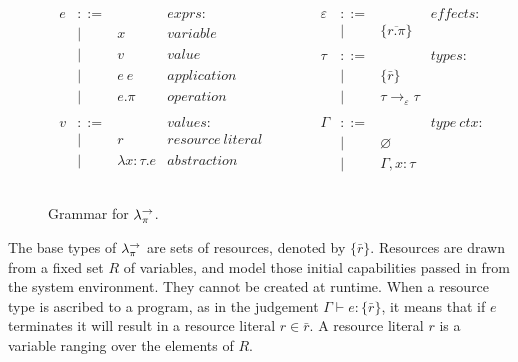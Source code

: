 \begin{figure}[h]
\vspace{-5pt}

\[
\begin{array}{lll}

\begin{array}{lllr}

e & ::= & ~ & exprs: \\
	& | & x & variable \\
	& | & v & value \\
	& | & e ~ e & application \\
	& | & e.\pi & operation \\
	&&\\

v & ::= & ~ & values: \\
	& | & r & resource~literal \\
	& | & \lambda x: \tau.e & abstraction \\
	&&\\

\end{array}

& ~~~~~~~~&

\begin{array}{lllr}

\varepsilon & ::= & ~ & effects: \\
	& | & \{ \overline{r.\pi} \} \\
	&&\\

\tau & ::= & ~ & types: \\
		& | & \{ \bar r \} \\
		& | & \tau \rightarrow_{\varepsilon} \tau \\ 
		&&\\

\Gamma & ::= & ~ & type~ctx: \\
				& | & \varnothing \\
				& | & \Gamma, x: \tau \\
				&&\\
\end{array}

\end{array}
\]

\vspace{-7pt}
\caption{Grammar for $\lambda^{\rightarrow}_{\pi}$.}
\label{This is the label.}
\end{figure}

The base types of $\lambda^{\rightarrow}_{\pi}$ are sets of resources, denoted by $\{ \bar r \}$. Resources are drawn from a fixed set $R$ of variables, and model those initial capabilities passed in from the system environment. They cannot be created at runtime. When a resource type is ascribed to a program, as in the judgement $\Gamma \vdash e: \{ \bar r \}$, it means that if $e$ terminates it will result in a resource literal $r \in \bar r$. A resource literal $r$ is a variable ranging over the elements of $R$.

